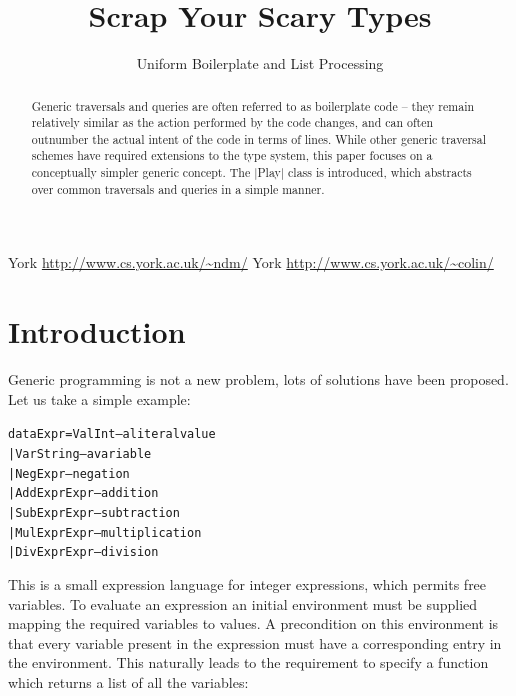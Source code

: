 \documentclass[preprint]{sigplanconf}
\newenvironment{code}{\begin{alltt}\small}{\end{alltt}}
\begin{document}
\copyrightdata{[to be supplied]}

\titlebanner{\today{} - \currenttime{}}        %
\preprintfooter{}   %

\title{Scrap Your Scary Types}
\subtitle{Uniform Boilerplate and List Processing}

           {York}
           {\url{http://www.cs.york.ac.uk/~ndm/}}
           {York}
           {\url{http://www.cs.york.ac.uk/~colin/}}

\maketitle

\begin{abstract}
Generic traversals and queries are often referred to as boilerplate code -- they remain relatively similar as the action performed by the code changes, and can often outnumber the actual intent of the code in terms of lines. While other generic traversal schemes have required extensions to the type system, this paper focuses on a conceptually simpler generic concept. The |Play| class is introduced, which abstracts over common traversals and queries in a simple manner.
\end{abstract}

\section{Introduction}

Generic programming is not a new problem, lots of solutions have been proposed. Let us take a simple example:

\begin{code}
data Expr  =  Val  Int         -- a literal value
           |  Var  String      -- a variable
           |  Neg  Expr        -- negation
           |  Add  Expr  Expr  -- addition
           |  Sub  Expr  Expr  -- subtraction
           |  Mul  Expr  Expr  -- multiplication
           |  Div  Expr  Expr  -- division
\end{code}

This is a small expression language for integer expressions, which permits free variables. To evaluate an expression an initial environment must be supplied mapping the required variables to values. A precondition on this environment is that every variable present in the expression must have a corresponding entry in the environment. This naturally leads to the requirement to specify a function which returns a list of all the variables:
\end{document}
